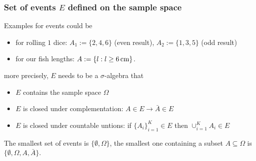 \subsubsection{Set of events $E$ defined on the sample space}
Examples for events could be
\begin{itemize}
    \item for rolling $1$ dice: $A_1:=\{2,4,6\}$ (even result), $A_2 := \{1,3,5\}$ (odd result)
    \item for our fish lengths: $A:=\{l:l\geq 6 \operatorname{cm}\}$.
\end{itemize}
more precisely, \textcolor{blue1}{$E$ needs to be a $\sigma$-algebra} that
\begin{itemize}
    \item $E$ contains the sample space $\Omega$
    \item $E$ is closed under complementation: $A \in E \rightarrow \bar{A} \in E$
    \item $E$ is closed under countable untions: if $\{A_i\}_{i=1}^K \in E$ then $\cup_{i=1}^K A_i \in E$
\end{itemize}
The smallest set of events is $\{\emptyset,\Omega\}$, the smallest one containing a subset
$A \subseteq \Omega$ is $\{\emptyset,\Omega, A, \bar{A}\}$.

